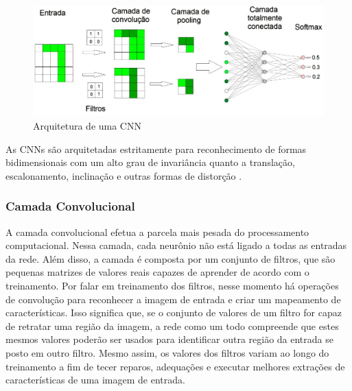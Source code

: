 \begin{figure}
    \centering
    \includegraphics[scale=0.25]{Relatorio/figuras/arch.png}
    \caption{Arquitetura de uma CNN \cite{eliveltoebermamrenatoa.krohling2018}}
    \label{fig:arch}
\end{figure}

As CNNs são arquitetadas estritamente para reconhecimento de formas bidimensionais com um alto grau de invariância quanto a translação, escalonamento, inclinação e outras formas de distorção \cite{haykin2007redes}.

\subsubsection{Camada Convolucional}

A camada convolucional efetua a parcela mais pesada do processamento computacional. Nessa camada, cada neurônio não está ligado a todas as entradas da rede. Além disso, a camada é composta por um conjunto de filtros, que são pequenas matrizes de valores reais capazes de aprender de acordo com o treinamento. Por falar em treinamento dos filtros, nesse momento há operações de convolução para reconhecer a imagem de entrada e criar um mapeamento de características. Isso significa que, se o conjunto de valores de um filtro for capaz de retratar uma região da imagem, a rede como um todo compreende que estes mesmos valores poderão ser usados para identificar outra região da entrada se posto em outro filtro. Mesmo assim, os valores dos filtros variam ao longo do treinamento a fim de tecer reparos, adequações e executar melhores extrações de características de uma imagem de entrada.

